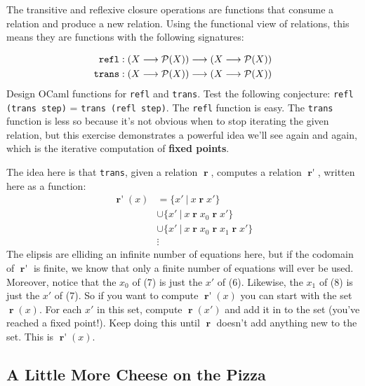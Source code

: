 \documentclass[11pt]{article}
\newcommand{\deftech}[1]{\textbf{#1}}
\newcommand\mrel{\mathop{\mathbf{r}}}
\newcommand\morel{\mathop{\mathbf{r}'}}
\newcommand{\syntax}[1]{{\tt #1}}
\begin{document}
\begin{exercise}
The transitive and reflexive closure operations are functions that
consume a relation and produce a new relation.  Using the functional
view of relations, this means they are functions with the following
signatures:

\begin{align*}
\syntax{refl} : (X \longrightarrow \mathcal{P}(X)) \longrightarrow (X \longrightarrow \mathcal{P}(X))\\
\syntax{trans} : (X \longrightarrow \mathcal{P}(X)) \longrightarrow (X \longrightarrow \mathcal{P}(X))\\
\end{align*}
%
Design OCaml functions for \syntax{refl} and \syntax{trans}.  Test the
following conjecture: \syntax{refl (trans step)} = \syntax{trans
  (refl step)}.  The \syntax{refl} function is easy.  The
\syntax{trans} function is less so because it's not obvious when to
stop iterating the given relation, but this exercise demonstrates a
powerful idea we'll see again and again, which is the iterative
computation of \deftech{fixed points}.

The idea here is that \syntax{trans}, given a relation $\mrel$,
computes a relation $\morel$, written here as a function:
\begin{align}
\morel(x) &= \{x'\ |\ x \mrel x'\} \\
&\cup \{x'\ |\ x \mrel x_0 \mrel x'\}\\
&\cup \{x'\ |\ x \mrel x_0 \mrel x_1 \mrel x'\}\\
&\vdots
\end{align}
%
The elipsis are elliding an infinite number of equations here, but if
the codomain of $\morel$ is finite, we know that only a finite number
of equations will ever be used.  Moreover, notice that the $x_0$ of
(7) is just the $x'$ of (6).  Likewise, the $x_1$ of (8) is just the
$x'$ of (7).  So if you want to compute $\morel(x)$ you can start with
the set $\mrel(x)$.  For each $x'$ in this set, compute $\mrel(x')$
and add it in to the set (you've reached a fixed point!).  Keep doing
this until $\mrel$ doesn't add anything new to the set.  This is
$\morel(x)$.
\end{exercise}


\subsection{A Little More Cheese on the Pizza}
\end{document}
